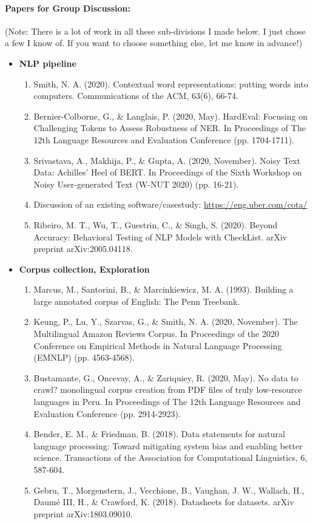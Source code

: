 \documentclass[11pt,a4paper]{article}
\begin{document}
\paragraph{Papers for Group Discussion: }  (Note: There is a lot of work in all these sub-divisions I made below. I just chose a few I know of. If you want to choose something else, let me know in advance!)
\begin{itemize}

\item \textbf{NLP pipeline}
\begin{enumerate}
\item Smith, N. A. (2020). Contextual word representations: putting words into computers. Communications of the ACM, 63(6), 66-74.
\item Bernier-Colborne, G., \& Langlais, P. (2020, May). HardEval: Focusing on Challenging Tokens to Assess Robustness of NER. In Proceedings of The 12th Language Resources and Evaluation Conference (pp. 1704-1711).
\item Srivastava, A., Makhija, P., \& Gupta, A. (2020, November). Noisy Text Data: Achilles’ Heel of BERT. In Proceedings of the Sixth Workshop on Noisy User-generated Text (W-NUT 2020) (pp. 16-21).
\item Discussion of an existing software/casestudy: \url{https://eng.uber.com/cota/}
\item Ribeiro, M. T., Wu, T., Guestrin, C., \& Singh, S. (2020). Beyond Accuracy: Behavioral Testing of NLP Models with CheckList. arXiv preprint arXiv:2005.04118.
\end{enumerate}

\item \textbf{Corpus collection, Exploration}
\begin{enumerate}
\item Marcus, M., Santorini, B., \& Marcinkiewicz, M. A. (1993). Building a large annotated corpus of English: The Penn Treebank.
\item Keung, P., Lu, Y., Szarvas, G., \& Smith, N. A. (2020, November). The Multilingual Amazon Reviews Corpus. In Proceedings of the 2020 Conference on Empirical Methods in Natural Language Processing (EMNLP) (pp. 4563-4568).
\item Bustamante, G., Oncevay, A., \& Zariquiey, R. (2020, May). No data to crawl? monolingual corpus creation from PDF files of truly low-resource languages in Peru. In Proceedings of The 12th Language Resources and Evaluation Conference (pp. 2914-2923).
\item Bender, E. M., \& Friedman, B. (2018). Data statements for natural language processing: Toward mitigating system bias and enabling better science. Transactions of the Association for Computational Linguistics, 6, 587-604.
\item Gebru, T., Morgenstern, J., Vecchione, B., Vaughan, J. W., Wallach, H., Daumé III, H., \& Crawford, K. (2018). Datasheets for datasets. arXiv preprint arXiv:1803.09010.
\end{enumerate}


\end{itemize}
\end{document}
